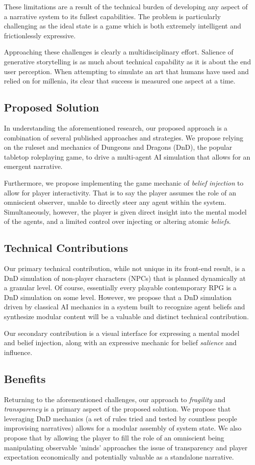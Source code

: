 \documentclass[letterpaper, 10 pt, conference]{ieeeconf}  %
\begin{document}
	These limitations are a result of the technical burden of developing any aspect of a narrative system to its fullest capabilities. The problem is particularly challenging as the ideal state is a game which is both extremely intelligent and frictionlessly expressive.  
	
Approaching these challenges is clearly a multidisciplinary effort. Salience of generative storytelling is as much about technical capability as it is about the end user perception. When attempting to simulate an art that humans have used and relied on for millenia, its clear that success is measured one aspect at a time.
\subsection{Proposed Solution}
In understanding the aforementioned research, our proposed approach is a combination of several published approaches and strategies. We propose relying on the ruleset and mechanics of Dungeons and Dragons (DnD), the popular tabletop roleplaying game, to drive a multi-agent AI simulation that allows for an emergent narrative.

Furthermore, we propose implementing the game mechanic of \emph{belief injection} to allow for player interactivity. That is to say the player assumes the role of an omniscient observer, unable to directly steer any agent within the system. Simultaneously, however, the player is  given direct insight into the mental model of the agents, and a limited control over injecting or altering atomic \emph{beliefs}.

\subsection{Technical Contributions}
	Our primary technical contribution, while not unique in its front-end result, is a DnD simulation of non-player characters (NPCs) that is planned dynamically at a granular level. Of course, essentially every playable contemporary RPG is a DnD simulation on some level. However, we propose that a DnD simulation driven by classical AI mechanics in a system built to recognize agent beliefs and synthesize modular content will be a valuable and distinct technical contribution.
	
	Our secondary contribution is a visual interface for expressing a mental model and belief injection, along with an expressive mechanic for belief \emph{salience} and influence.
	
\subsection{Benefits}
 Returning to the aforementioned challenges, our approach to \emph{fragility} and \emph{transparency} is a primary aspect of the proposed solution. We propose that leveraging DnD mechanics (a set of rules tried and tested by countless people improvising narratives) allows for a modular assembly of system state. We also propose that by allowing the player to fill the role of an omniscient being manipulating observable 'minds' approaches the issue of transparency and player expectation economically and potentially valuable as a standalone narrative.
 
\end{document}
